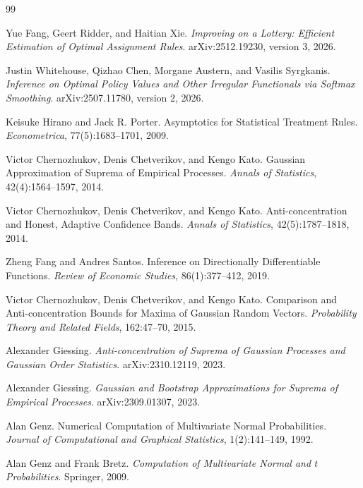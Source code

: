 \documentclass{article}
\begin{document}
\begin{thebibliography}{99}

   Yue Fang, Geert Ridder, and Haitian Xie. \emph{Improving on a Lottery: Efficient Estimation of Optimal Assignment Rules}. arXiv:2512.19230, version 3, 2026.

   Justin Whitehouse, Qizhao Chen, Morgane Austern, and Vasilis Syrgkanis. \emph{Inference on Optimal Policy Values and Other Irregular Functionals via Softmax Smoothing}. arXiv:2507.11780, version 2, 2026.

   Keisuke Hirano and Jack R. Porter. Asymptotics for Statistical Treatment Rules. \emph{Econometrica}, 77(5):1683--1701, 2009.

   Victor Chernozhukov, Denis Chetverikov, and Kengo Kato. Gaussian Approximation of Suprema of Empirical Processes. \emph{Annals of Statistics}, 42(4):1564--1597, 2014.

   Victor Chernozhukov, Denis Chetverikov, and Kengo Kato. Anti-concentration and Honest, Adaptive Confidence Bands. \emph{Annals of Statistics}, 42(5):1787--1818, 2014.

   Zheng Fang and Andres Santos. Inference on Directionally Differentiable Functions. \emph{Review of Economic Studies}, 86(1):377--412, 2019.

   Victor Chernozhukov, Denis Chetverikov, and Kengo Kato. Comparison and Anti-concentration Bounds for Maxima of Gaussian Random Vectors. \emph{Probability Theory and Related Fields}, 162:47--70, 2015.

   Alexander Giessing. \emph{Anti-concentration of Suprema of Gaussian Processes and Gaussian Order Statistics}. arXiv:2310.12119, 2023.

   Alexander Giessing. \emph{Gaussian and Bootstrap Approximations for Suprema of Empirical Processes}. arXiv:2309.01307, 2023.

   Alan Genz. Numerical Computation of Multivariate Normal Probabilities. \emph{Journal of Computational and Graphical Statistics}, 1(2):141--149, 1992.

   Alan Genz and Frank Bretz. \emph{Computation of Multivariate Normal and \(t\) Probabilities}. Springer, 2009.


\end{thebibliography}
\end{document}

